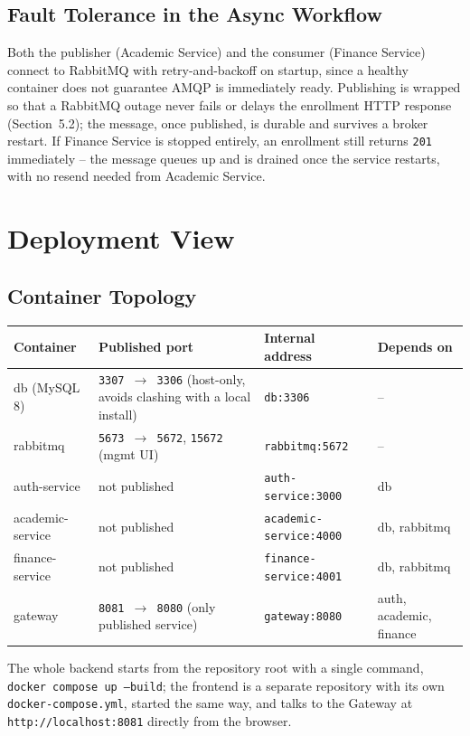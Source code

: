 \documentclass[11pt,a4paper]{report}
\begin{document}
\section{Fault Tolerance in the Async Workflow}
Both the publisher (Academic Service) and the consumer (Finance Service)
connect to RabbitMQ with retry-and-backoff on startup, since a healthy
container does not guarantee AMQP is immediately ready. Publishing is
wrapped so that a RabbitMQ outage never fails or delays the enrollment HTTP
response (Section~5.2); the message, once published, is durable and
survives a broker restart. If Finance Service is stopped entirely, an
enrollment still returns \texttt{201} immediately -- the message queues up
and is drained once the service restarts, with no resend needed from
Academic Service.

\chapter{Deployment View}

\section{Container Topology}
\begin{longtable}{L{2.8cm} L{4.4cm} L{4.0cm} L{2.4cm}}
\toprule
\textbf{Container} & \textbf{Published port} & \textbf{Internal address} & \textbf{Depends on} \\
\midrule
\endhead
db (MySQL 8) & \texttt{3307 $\to$ 3306} (host-only, avoids clashing with a local install) & \texttt{db:3306} & -- \\
rabbitmq & \texttt{5673 $\to$ 5672}, \texttt{15672} (mgmt UI) & \texttt{rabbitmq:5672} & -- \\
auth-service & not published & \texttt{auth-service:3000} & db \\
academic-service & not published & \texttt{academic-service:4000} & db, rabbitmq \\
finance-service & not published & \texttt{finance-service:4001} & db, rabbitmq \\
gateway & \texttt{8081 $\to$ 8080} (only published service) & \texttt{gateway:8080} & auth, academic, finance \\
\bottomrule
\end{longtable}

The whole backend starts from the repository root with a single command,
\texttt{docker compose up --build}; the frontend is a separate repository
with its own \texttt{docker-compose.yml}, started the same way, and talks
to the Gateway at \texttt{http://localhost:8081} directly from the browser.
\end{document}
